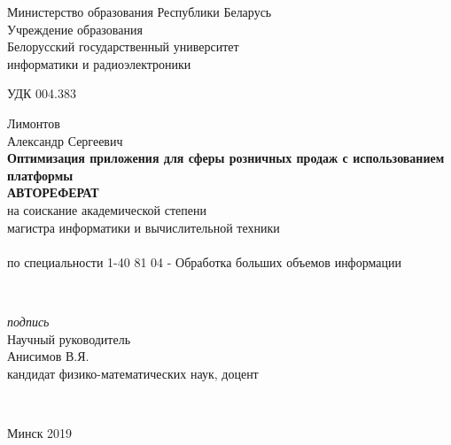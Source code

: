 \begin{titlepage}
  \begin{center}
    Министерство образования Республики Беларусь\\[1em]
    Учреждение образования\\
    Белорусский государственный университет\\ информатики и радиоэлектроники\\[2em]
  \end{center}

УДК 004.383\\[2em]

  \begin{center}
    Лимонтов\\
    Александр Сергеевич
    \\[1em]
    \textbf{Оптимизация приложения для сферы розничных продаж с использованием платформы \LB}\\[3em]
    \textbf{\large\MakeUppercase{Автореферат}}\\
    на соискание академической степени\\магистра информатики и вычислительной техники\\
    \\[1em]
    по специальности 1-40 81 04 - Обработка больших объемов информации
  \end{center}\\[2em]

  \begin{flushright}
    \begin{minipage}{0.42\textwidth}
      \textit{подпись}\\[1em]
      Научный руководитель\\
      Анисимов В.Я.\\
      кандидат физико-ма\-те\-ма\-ти\-чес\-ких наук, доцент\\
    \end{minipage}\\[2.2em]
  \end{flushright}

  \mbox{}
  \vfill
  \begin{center}Минск 2019\end{center}
\end{titlepage}

